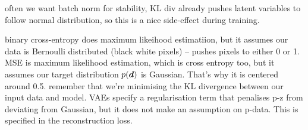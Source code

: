often we want batch norm for stability, KL div already pushes latent variables to follow normal distribution, so this is a nice side-effect during training.


binary cross-entropy does maximum likeihood estimatiion, but it assumes our data is Bernoulli distributed (black white pixels) -- pushes pixels to either 0 or 1.
MSE is maximum likelihood estimation, which is cross entropy too, but it assumes our target distribution $p({\boldsymbol{d}})$ is Gaussian. That's why it is centered around 0.5.
remember that we're minimising the KL divergence between our input data and model. VAEs specify a regularisation term that penalises p-z from deviating from Gaussian, but it does not make an assumption on p-data. This is specified in the reconstruction loss.